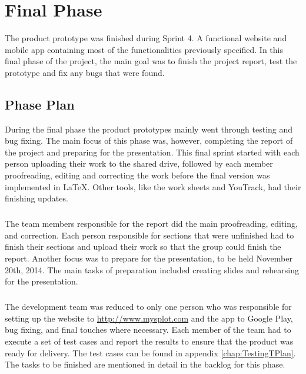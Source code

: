 \chapter{Final Phase}
\label{chap:FinalPhase}

The product prototype was finished during Sprint 4. A functional website and mobile app containing most of the functionalities previously specified. In this final phase of the project, the main goal was to finish the project report, test the prototype and fix any bugs that were found.

\section{Phase Plan}
\label{sec:FinalPlan}

During the final phase the product prototypes mainly went through testing and bug fixing. The main focus of this phase was, however, completing the report of the project and preparing for the presentation. This final sprint started with each person uploading their work to the shared drive, followed by each member proofreading, editing and correcting the work before the final version was implemented in LaTeX. Other tools, like the work sheets and YouTrack, had their finishing updates.

\paragraph{} The team members responsible for the report did the main proofreading, editing, and correction. Each person responsible for sections that were unfinished had to finish their sections and upload their work so that the group could finish the report. Another focus was to prepare for the presentation, to be held November 20th, 2014. The main tasks of preparation included creating slides and rehearsing for the presentation.

\paragraph{} The development team was reduced to only one person who was responsible for setting up the website to \href{www.mysplot.com}{http://www.mysplot.com} and the app to Google Play, bug fixing, and final touches where necessary. Each member of the team had to execute a set of test cases and report the results to ensure that the product was ready for delivery. The test cases can be found in appendix \ref{chap:TestingTPlan}.
The tasks to be finished are mentioned in detail in the backlog for this phase.

